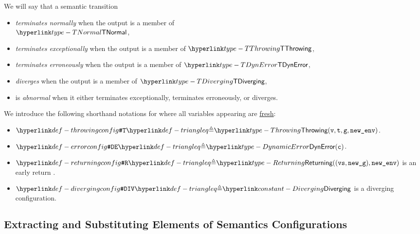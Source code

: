 We will say that a semantic transition
\begin{itemize}
\item \emph{terminates normally} when the output \semanticsconfigurationterm{} is a member of \\
      $\TNormal$,
\item \emph{terminates exceptionally} when the output \semanticsconfigurationterm{} is a member of $\TThrowing$,
\item \emph{terminates erroneously} when the output \semanticsconfigurationterm{} is a member of $\TDynError$,
\item \emph{diverges} when the output \semanticsconfigurationterm{} is a member of $\TDiverging$,
\item is \emph{abnormal} when it either terminates exceptionally, terminates erroneously, or diverges.
\end{itemize}

We introduce the following shorthand notations for \semanticsconfigurationsterm{} where all variables
appearing are \hyperlink{def-freshvariables}{fresh}:
\begin{itemize}
\hypertarget{def-throwingconfig}{}
\item $\ThrowingConfig \triangleq \Throwing(\vv, \vt, \vg, \newenv)$.
      \hypertarget{def-errorconfig}{}
\item $\DynErrorConfig \triangleq \DynamicError(\vc)$.
      \hypertarget{def-returningconfig}{}
\item $\ReturningConfig \triangleq \Returning((\vvs,\newg), \newenv)$
      is an early return \semanticsconfigurationterm{}.
      \hypertarget{def-divergingconfig}{}
\item $\DivergingConfig \triangleq \Diverging$ is a diverging configuration.
\end{itemize}

\subsection{Extracting and Substituting Elements of Semantics Configurations}

